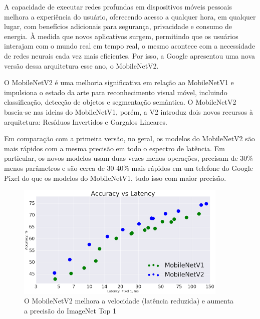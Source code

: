 

A capacidade de executar redes profundas em dispositivos móveis pessoais melhora a experiência do usuário, oferecendo acesso a qualquer hora, em qualquer lugar, com benefícios adicionais para segurança, privacidade e consumo de energia. À medida que novos aplicativos surgem, permitindo que os usuários interajam com o mundo real em tempo real, o mesmo acontece com a necessidade de redes neurais cada vez mais eficientes. Por isso, a Google apresentou uma nova versão dessa arquitetura esse ano, o MobileNetV2.


O MobileNetV2 é uma melhoria significativa em relação ao MobileNetV1 e impulsiona o estado da arte para reconhecimento visual móvel, incluindo classificação, detecção de objetos e segmentação semântica. O MobileNetV2 baseia-se nas ideias do MobileNetV1, porém, a V2 introduz dois novos recursos à arquitetura: Resíduos Invertidos e Gargalos Lineares.

Em comparação com a primeira versão, no geral, os modelos do MobileNetV2 são mais rápidos com a mesma precisão em todo o espectro de latência. Em particular, os novos modelos usam duas vezes menos operações, precisam de 30\% menos parâmetros e são cerca de 30-40\% mais rápidos em um telefone do Google Pixel do que os modelos do MobileNetV1, tudo isso com maior precisão.


\begin{figure}[!ht]
\centering 
\caption{O MobileNetV2 melhora a velocidade (latência reduzida) e aumenta a precisão do ImageNet Top 1}
\label{fig:mobilenetv1vsv2}
\includegraphics[width=0.9\textwidth]{imgs/mobilenetv1vsv2.png}
\end{figure}


